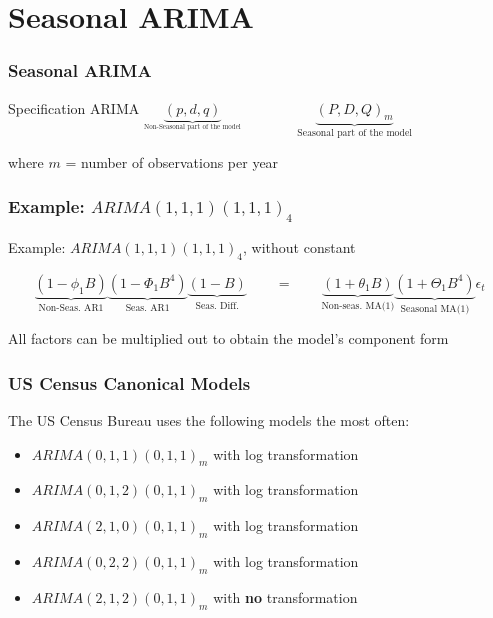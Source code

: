 \documentclass{beamer}
\begin{document}
\section{Seasonal ARIMA}
\begin{frame}
  \frametitle{Seasonal ARIMA}

  \begin{block}{Specification}
    ARIMA  $ \underbrace{(p, d, q)}_{_{\text{Non-Seasonal part of the model}}} \qquad \qquad \underbrace{(P, D, Q)_m}_{\text{Seasonal part of the model}}$
  \end{block}

\medskip
  
where $m$ = number of observations per year
  
\end{frame}


\begin{frame}
  \frametitle{Example: $ARIMA(1,1,1)(1,1,1)_4$}

Example: $ARIMA(1,1,1)(1,1,1)_4$, without constant

\begin{equation*}
  \underbrace{(1-\phi_1B)}_{\text{Non-Seas. AR1}} \underbrace{(1-\Phi_1B^4)}_{\text{Seas. AR1}}\underbrace{(1-B)}_{\text{Seas. Diff.}} \qquad = \qquad \underbrace{(1+\theta_1 B)}_{\text{Non-seas. MA(1)}} \underbrace{(1+\Theta_1 B^4)}_{\text{Seasonal MA(1)}}\epsilon_t
\end{equation*}

\medskip

  All factors can be multiplied out to obtain the model's component form
\end{frame}



\begin{frame}
  \frametitle{US Census Canonical Models}

  The US Census Bureau uses the following models the most often:

  \begin{itemize}
  \item $ARIMA(0,1,1)(0,1,1)_m$ with log transformation
  \item $ARIMA(0,1,2)(0,1,1)_m$ with log transformation
  \item $ARIMA(2,1,0)(0,1,1)_m$ with log transformation
  \item $ARIMA(0,2,2)(0,1,1)_m$ with log transformation
  \item $ARIMA(2,1,2)(0,1,1)_m$ with \textbf{no} transformation    
  \end{itemize}  
\end{frame}
\end{document}
